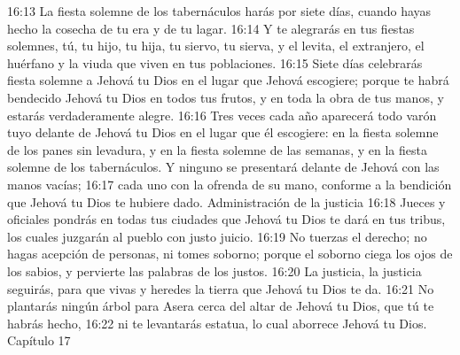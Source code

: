 16:13 La fiesta solemne de los tabernáculos harás por siete días, cuando hayas hecho la cosecha de tu era y de tu lagar.  
16:14 Y te alegrarás en tus fiestas solemnes, tú, tu hijo, tu hija, tu siervo, tu sierva, y el levita, el extranjero, el huérfano y la viuda que viven en tus poblaciones.  
16:15 Siete días celebrarás fiesta solemne a Jehová tu Dios en el lugar que Jehová escogiere; porque te habrá bendecido Jehová tu Dios en todos tus frutos, y en toda la obra de tus manos, y estarás verdaderamente alegre. 
16:16 Tres veces cada año aparecerá todo varón tuyo delante de Jehová tu Dios en el lugar que él escogiere: en la fiesta solemne de los panes sin levadura, y en la fiesta solemne de las semanas, y en la fiesta solemne de los tabernáculos. Y ninguno se presentará delante de Jehová con las manos vacías;  
16:17 cada uno con la ofrenda de su mano, conforme a la bendición que Jehová tu Dios te hubiere dado.  
Administración de la justicia  
16:18 Jueces y oficiales pondrás en todas tus ciudades que Jehová tu Dios te dará en tus tribus, los cuales juzgarán al pueblo con justo juicio.  
16:19 No tuerzas el derecho; no hagas acepción de personas, ni tomes soborno; porque el soborno ciega los ojos de los sabios, y pervierte las palabras de los justos.  
16:20 La justicia, la justicia seguirás, para que vivas y heredes la tierra que Jehová tu Dios te da.  
16:21 No plantarás ningún árbol para Asera cerca del altar de Jehová tu Dios, que tú te habrás hecho,  
16:22 ni te levantarás estatua, lo cual aborrece Jehová tu Dios.  
Capítulo 17 

